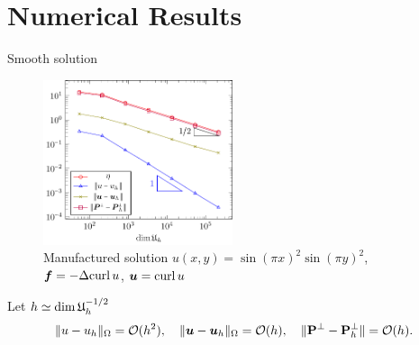 \documentclass[10pt, compress]{beamer}
\begin{document}
\section{Numerical Results}
\begin{frame}{Smooth solution}
    \begin{figure}
        \centering
        \includegraphics[width=15em]{plots_stokes.pdf}
        \caption{Manufactured solution $u(x,y)=\sin(\pi x)^2 \sin(\pi y)^2$, $\boldsymbol{f} = -\Delta {\rm curl\,} u$, $\boldsymbol{u}={\rm curl\,} u$ }
        \label{fig:enter-label}
    \end{figure}
Let $h \simeq \dim \mathfrak{U}_h^{-1/2}$
\begin{align*}
    \|u-u_h\|_\Omega = \mathcal{O}(h^2), \quad \|\boldsymbol{u}-\boldsymbol{u}_h\|_\Omega = \mathcal{O}(h), \quad \|\mathbf{P}^\perp-\mathbf{P}_h^\perp\| = \mathcal{O}(h).
\end{align*}
\end{frame}

\end{document}
